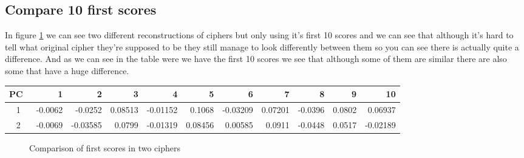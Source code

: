 \documentclass[paper=a4, fontsize=11pt]{scrartcl} %
\begin{document}
\subsection{Compare 10 first scores}
In figure \ref{fig:score} we can see two different reconstructions of ciphers but only using it's first 10 scores and we can see that although it's hard to tell what original cipher they're supposed to be they still manage to look differently between them so you can see there is actually quite a difference. And as we can see in the table were we have the first 10 scores we see that although some of them are similar there are also some that have a huge difference.
\begin{table}
\begin{tabular}{|c|r|r|r|r|r|r|r|r|r|r|}
\hline
PC\ & 1 & 2 & 3 & 4 & 5 & 6 & 7 & 8 & 9 & 10 \\ \hline
1    & -0.0062  & -0.0252  & 0.08513  & -0.01152 & 0.1068 & -0.03209 & 0.07201 & -0.0396 & 0.0802 & 0.06937       \\
2    & -0.0069 & -0.03585 & 0.0799 & -0.01319 &0.08456 & 0.00585 & 0.0911 & -0.0448 & 0.0517 & -0.02189          \\ \hline
\end{tabular}
\end{table}
\clearpage

\begin{figure}[h]
    \centering
    \caption{Comparison of first scores in two ciphers}
    \label{fig:score}
\end{figure}
\end{document}
